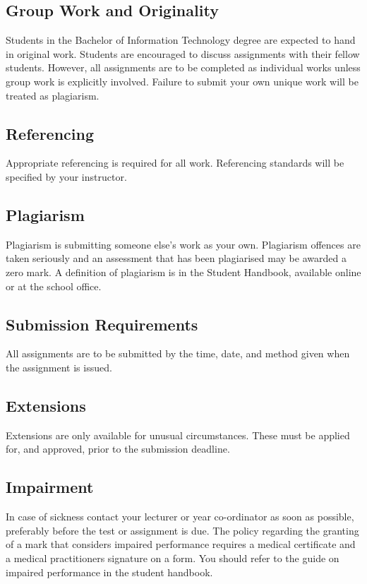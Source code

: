 \documentclass{article}
\begin{document}
\subsection*{Group Work and Originality}
Students in the Bachelor of Information Technology degree are expected to hand in original work.  Students are encouraged to discuss
assignments with their fellow students.  However, all assignments are to be completed as individual works unless group work is explicitly involved.
Failure to submit your own unique work will be treated as plagiarism.

\subsection*{Referencing}
Appropriate referencing is required for all work.  Referencing standards will be specified by your instructor.

\subsection*{Plagiarism}
Plagiarism is submitting someone else's work as your own.  Plagiarism offences are taken seriously and an
assessment that has been plagiarised may be awarded a zero mark.  A definition of plagiarism is in the Student Handbook,
available online or at the school office.

\subsection*{Submission Requirements}
All assignments are to be submitted by the time, date, and method given when the assignment is issued.

\subsection*{Extensions}
Extensions are only available for unusual circumstances.  These must be applied for, and approved, prior to the submission deadline.

\subsection*{Impairment}
In case of sickness contact your lecturer or year co-ordinator as soon as possible, preferably before the test or
assignment is due.  The policy regarding the granting of a mark that considers impaired performance requires a medical
certificate and a medical practitioners signature on a form. You should refer to the guide on impaired performance
in the student handbook.
\end{document}
